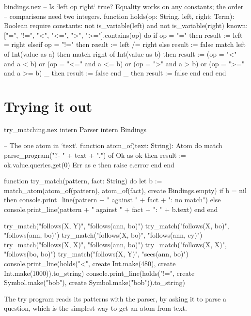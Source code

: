 \begin{continued}{bindings.nex}
-- Is `left op right` true? Equality works on any constants; the order
-- comparisons need two integers.
function holds(op: String, left, right: Term): Boolean
require
  constants: not is_variable(left) and not is_variable(right)
  known: ["=", "!=", "<", "<=", ">", ">="].contains(op)
do
  if op = "=" then
    result := left = right
  elseif op = "!=" then
    result := left /= right
  else
    result := false
    match left of
      Int(value as a) then
        match right of
          Int(value as b) then
            result := (op = "<" and a < b) or (op = "<=" and a <= b)
                      or (op = ">" and a > b) or (op = ">=" and a >= b)
          _ then result := false
        end
      _ then result := false
    end
  end
end
\end{continued}

\section{Trying it out}

\begin{tryit}{try_matching.nex}
intern Parser
intern Bindings

-- The one atom in `text`.
function atom_of(text: String): Atom
do
  match parse_program("?- " + text + ".") of
    Ok as ok then result := ok.value.queries.get(0)
    Err as e then raise e.error
  end
end

function try_match(pattern, fact: String)
do
  let b := match_atom(atom_of(pattern), atom_of(fact), create Bindings.empty)
  if b = nil then
    console.print_line(pattern + " against " + fact + ": no match")
  else
    console.print_line(pattern + " against " + fact + ": " + b.text)
  end
end

try_match("follows(X, Y)", "follows(ann, bo)")
try_match("follows(X, bo)", "follows(ann, bo)")
try_match("follows(X, bo)", "follows(ann, cy)")
try_match("follows(X, X)", "follows(ann, bo)")
try_match("follows(X, X)", "follows(bo, bo)")
try_match("follows(X, Y)", "sees(ann, bo)")
console.print_line(holds("<", create Int.make(480), create Int.make(1000)).to_string)
console.print_line(holds("!=", create Symbol.make("bob"), create Symbol.make("bob")).to_string)
\end{tryit}

The try program reads its patterns with the parser, by asking it to parse a
question, which is the simplest way to get an atom from text.
